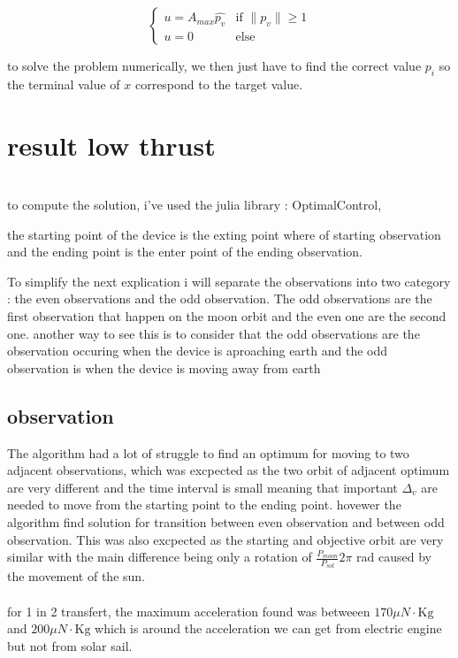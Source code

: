 \documentclass{article} %
\begin{document}
{			$$
			\begin{cases}
				 u =A_{max}\widehat{p_v} & \text{if }\|p_v\| \ge 1\\
				 u =0 & \text{else}
			\end{cases}
			$$
			
			to solve the problem numerically, we then just have to find the correct value $p_i$ so the terminal value of $x$ correspond to the target value.
			
			\section{result low thrust}
				\\
			to compute the solution, i've used the julia library : OptimalControl,
			
			the starting point of the device is the exting point where of starting observation and the ending point is the enter point of the ending observation.
			
			To simplify the next explication i will separate the observations into two category : the even observations and the odd observation. The odd observations are the first observation that happen on the moon orbit and the even one are the second one. another way to see this is to consider that the odd observations are the observation occuring when the device is aproaching earth and the odd observation is when the device is moving away from earth
			
			\subsection{observation}
			The algorithm had a lot of struggle to find an optimum for moving to two adjacent observations, which was excpected as the two orbit of adjacent optimum are very different and the time interval is small meaning that important $\Delta_v$ are needed to move from the starting point to the ending point. hovewer the algorithm find solution for transition between even observation and between odd observation. This was also excpected as the starting and objective orbit are very similar with the main difference being only a rotation of $\frac{P_{moon}}{P_{sol}}2\pi $ rad caused by the movement of the sun.
			\\ \\
			for 1 in 2 transfert, the maximum acceleration found was betweeen $170 \mu{N}\cdot\text{Kg}$ and $200 \mu{N}\cdot\text{Kg}$ which is around the acceleration we can get from electric engine but not from solar sail.
		
}
\end{document}
